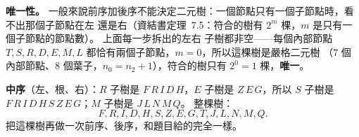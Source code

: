 \begin{pastsoln}
\textbf{唯一性。} 一般來說前序加後序不能決定二元樹：一個節點只有一個子節點時，看不出那個子節點在左
還是右（資結書定理~7.5：符合的樹有 $2^m$ 棵，$m$ 是只有一個子節點的節點數）。 上面每一步拆出的左右
子樹都非空——每個內部節點 $T, S, R, D, E, M, L$ 都恰有兩個子節點，$m = 0$，所以這棵樹是嚴格二元樹
（$7$ 個內部節點、$8$ 個葉子，$n_0 = n_2 + 1$），符合的樹只有 $2^0 = 1$ 棵，\textbf{唯一}。

\textbf{中序}（左、根、右）：$R$ 子樹是 $F\,R\,I\,D\,H$，$E$ 子樹是 $Z\,E\,G$，所以 $S$ 子樹是
$F\,R\,I\,D\,H\,S\,Z\,E\,G$；$M$ 子樹是 $J\,L\,N\,M\,Q$。 整棵樹：
\[
F, R, I, D, H, S, Z, E, G, T, J, L, N, M, Q.
\]
把這棵樹再做一次前序、後序，和題目給的完全一樣。
\end{pastsoln}
